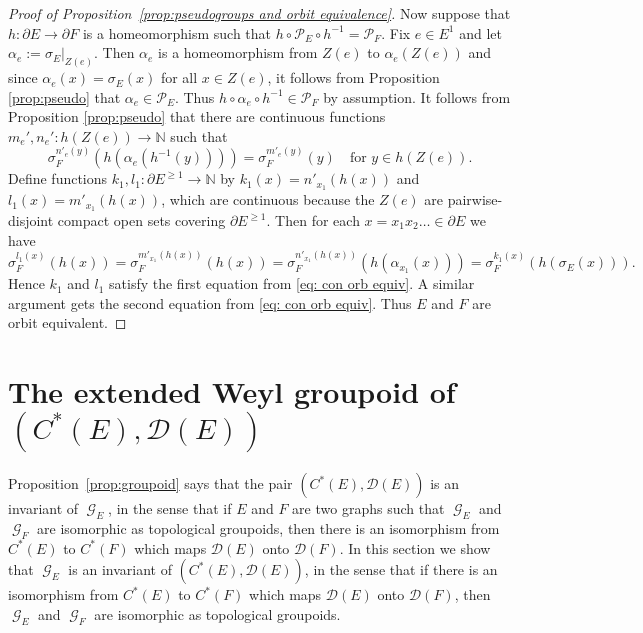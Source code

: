 \documentclass[12pt, a4paper]{amsart}
\numberwithin{equation}{section}
\theoremstyle{definition}
\theoremstyle{remark}
\begin{document}
\begin{proof}[Proof of Proposition~\ref{prop:pseudogroups and orbit equivalence}]
Now suppose that $h:\partial E\to \partial F$ is a homeomorphism such that 
$h\circ\mathcal{P}_E\circ h^{-1}=\mathcal{P}_F$. Fix $e\in E^1$ and let 
$\alpha_e:=\sigma_E|_{Z(e)}$. Then $\alpha_e$ is a homeomorphism from $Z(e)$ to 
$\alpha_e(Z(e))$ and since $\alpha_e(x)=\sigma_E(x)$ for all $x\in Z(e)$, it 
follows from Proposition \ref{prop:pseudo} that $\alpha_e\in\mathcal{P}_E$. 
Thus $h\circ\alpha_e\circ h^{-1}\in\mathcal{P}_F$ by assumption. It follows 
from Proposition \ref{prop:pseudo} that there are continuous functions 
$m_e',n_e':h(Z(e))\to{\mathbb{N}}$ such that 
\begin{equation*}
\sigma_F^{n'_e(y)}(h(\alpha_e(h^{-1}(y))))=\sigma_F^{m'_e(y)}(y)\quad\text{for 
$y\in h(Z(e))$.}
\end{equation*}
Define functions $k_1,l_1:\partial E^{\ge 1}\to{\mathbb{N}}$ by $k_1(x)=n'_{x_1}(h(x))$ 
and $l_1(x)=m'_{x_1}(h(x))$, which are continuous because the $Z(e)$ are 
pairwise-disjoint compact open sets covering $\partial E^{\ge 1}$. Then for 
each $x=x_1x_2\dots\in \partial E$ we have
\begin{equation*}
	\sigma_F^{l_1(x)}(h(x))=\sigma_F^{m'_{x_1}(h(x))}(h(x))=\sigma_F^{n'_{x_1}(h(x))}(h(\alpha_{x_1}(x)))=\sigma_F^{k_1(x)}(h(\sigma_E(x))).
\end{equation*}
Hence $k_1$ and $l_1$ satisfy the first equation from \eqref{eq: con orb 
equiv}. A similar argument gets the second equation from \eqref{eq: con orb 
equiv}. Thus $E$ and $F$ are orbit equivalent.
\end{proof}

\section{The extended Weyl groupoid of $(C^*(E),\mathcal{D}(E))$}\label{sec: 
ext Weyl}

Proposition~\ref{prop:groupoid} says that the pair $(C^*(E),\mathcal{D}(E))$ 
is an invariant of ${\operatorname{\mathcal{G}}}_E$, in the sense that if $E$ and $F$ are two graphs 
such that ${\operatorname{\mathcal{G}}}_E$ and ${\operatorname{\mathcal{G}}}_F$ are isomorphic as topological groupoids, then 
there is an isomorphism from $C^*(E)$ to $C^*(F)$ which maps $\mathcal{D}(E)$ 
onto $\mathcal{D}(F)$. In this section we show that ${\operatorname{\mathcal{G}}}_E$ is an invariant 
of $(C^*(E),\mathcal{D}(E))$, in the sense that if there is an isomorphism 
from $C^*(E)$ to $C^*(F)$ which maps $\mathcal{D}(E)$ onto $\mathcal{D}(F)$, 
then ${\operatorname{\mathcal{G}}}_E$ and ${\operatorname{\mathcal{G}}}_F$ are isomorphic as topological groupoids.
\end{document}
